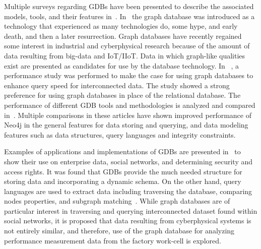 Multiple surveys regarding GDBs have been presented to describe the associated models, tools, and their features in~\cite{Angles:2008:SGD:1322432.1322433,7148480,GDB_overview}. In~\cite{Angles:2008:SGD:1322432.1322433} the graph database was introduced as a technology that experienced as many technologies do, some hype, and early death, and then a later resurrection.  Graph databases have recently regained some interest in industrial and cyberphysical research because of the amount of data resulting from big-data and IoT/IIoT.  Data in which graph-like qualities exist are presented as candidates for use by the database technology.  In ~\cite{GDB_overview}, a performance study was performed to make the case for using graph databases to enhance query speed for interconnected data.  The study showed a strong preference for using graph databases in place of the relational database.  The performance of different GDB tools and methodologies is analyzed and compared in~\cite{Jadhav2015ComparativeAO,Macko:2013:PIG:2485732.2485750}. Multiple comparisons in these articles have shown improved performance of Neo4j in the general features for data storing and querying, and data modeling features such as data structures, query languages and integrity constraints.  

Examples of applications and implementations of GDBs are presented in~\cite{modern_models} to show their use on enterprise data, social networks, and determining security and access rights. It was found that GDBs provide the much needed structure for storing data and incorporating a dynamic schema. On the other hand, query languages are used to extract data including traversing the database, comparing nodes properties, and subgraph matching~\cite{Wood2012QueryLF}. While graph databases are of particular interest in traversing and querying interconnected dataset found within social networks, it is proposed that data resulting from cyberphysical systems is not entirely similar, and therefore, use of the graph database for analyzing performance measurement data from the factory work-cell is explored. 

